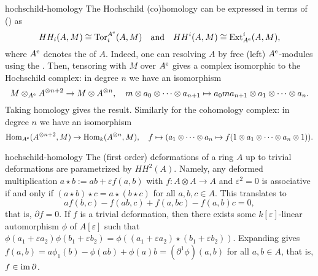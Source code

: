 \begin{example}{hochschild-homology}
    The Hochschild (co)homology can be expressed in terms of  () as
    \[ HH_i(A, M) \cong \textup{Tor}_i^{A^\textup{e}}(A, M) \quad \text{and} \quad HH^i(A, M) \cong \textup{Ext}^i_{A^\textup{e}}(A, M) , \]
    where $A^\textup{e}$ denotes the  of $A$. Indeed, one can resolving $A$ by free (left) $A^\textup{e}$-modules using the . Then, tensoring with $M$ over $A^\textup{e}$ gives a complex isomorphic to the Hochschild complex: in degree $n$ we have an isomorphism
    \[ M \otimes_{A^\textup{e}} A^{\otimes n + 2} \to M \otimes A^{\otimes n}, \quad m \otimes a_0 \otimes \cdots \otimes a_{n + 1} \mapsto a_0 m a_{n + 1} \otimes a_1 \otimes \cdots \otimes a_n . \]
    Taking homology gives the result. Similarly for the cohomology complex: in degree $n$ we have an isomorphism
    \[ \operatorname{Hom}_{A^\textup{e}}(A^{\otimes n + 2}, M) \to \operatorname{Hom}_k(A^{\otimes n}, M), \quad f \mapsto (a_1 \otimes \cdots \otimes a_n \mapsto f(1 \otimes a_1 \otimes \cdots \otimes a_n \otimes 1)) . \]
\end{example}


\begin{example}{hochschild-homology}
    The (first order) deformations of a ring $A$ up to trivial deformations are parametrized by $HH^2(A)$. Namely, any deformed multiplication $a \star b := ab + \varepsilon f(a, b)$ with $f : A \otimes A \to A$ and $\varepsilon^2 = 0$ is associative if and only if $(a \star b) \star c = a \star (b \star c)$ for all $a, b, c \in A$. This translates to
    \[ a f(b, c) - f(ab, c) + f(a, bc) - f(a, b) c = 0 , \]
    that is, $\partial f = 0$. If $f$ is a trivial deformation, then there exists some $k[\varepsilon]$-linear automorphism $\phi$ of $A[\varepsilon]$ such that $\phi(a_1 + \varepsilon a_2) \phi(b_1 + \varepsilon b_2) = \phi((a_1 + \varepsilon a_2) \star (b_1 + \varepsilon b_2))$. Expanding gives $f(a, b) = a \phi_1(b) - \phi(ab) + \phi(a) b = (\partial^1 \phi)(a, b)$ for all $a, b \in A$, that is, $f \in \operatorname{im} \partial$.
\end{example}

